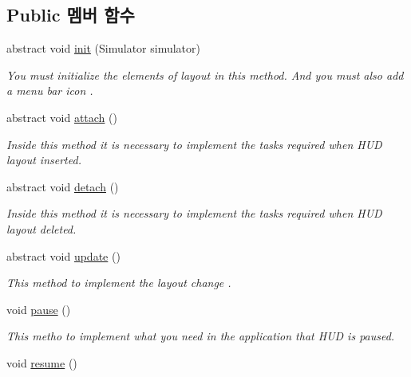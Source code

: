 \subsection*{Public 멤버 함수}
\begin{DoxyCompactItemize}
\item 
abstract void \hyperlink{classkr_1_1ac_1_1kookmin_1_1cs_1_1hud_1_1_h_u_d_class_template_a30a209182edaf92713b172109e0e4693}{init} (Simulator simulator)
\begin{DoxyCompactList}\small\item\em You must initialize the elements of layout in this method. And you must also add a menu bar icon . \end{DoxyCompactList}\item 
abstract void \hyperlink{classkr_1_1ac_1_1kookmin_1_1cs_1_1hud_1_1_h_u_d_class_template_a053bfe4a8c5121e8910f1c6416e3da4c}{attach} ()
\begin{DoxyCompactList}\small\item\em Inside this method it is necessary to implement the tasks required when H\+U\+D layout inserted. \end{DoxyCompactList}\item 
abstract void \hyperlink{classkr_1_1ac_1_1kookmin_1_1cs_1_1hud_1_1_h_u_d_class_template_a24cbcfc7dac21b475f806b9298b9846e}{detach} ()
\begin{DoxyCompactList}\small\item\em Inside this method it is necessary to implement the tasks required when H\+U\+D layout deleted. \end{DoxyCompactList}\item 
abstract void \hyperlink{classkr_1_1ac_1_1kookmin_1_1cs_1_1hud_1_1_h_u_d_class_template_aa50760c142875775a12df392814f4572}{update} ()
\begin{DoxyCompactList}\small\item\em This method to implement the layout change . \end{DoxyCompactList}\item 
void \hyperlink{classkr_1_1ac_1_1kookmin_1_1cs_1_1hud_1_1_h_u_d_class_template_abb46b8cd2704ee02c1de01b8e60bae62}{pause} ()
\begin{DoxyCompactList}\small\item\em This metho to implement what you need in the application that H\+U\+D is paused. \end{DoxyCompactList}\item 
void \hyperlink{classkr_1_1ac_1_1kookmin_1_1cs_1_1hud_1_1_h_u_d_class_template_ae546a0f18829e5012b1f0ae1c82ee4bb}{resume} ()

\end{DoxyCompactItemize}
